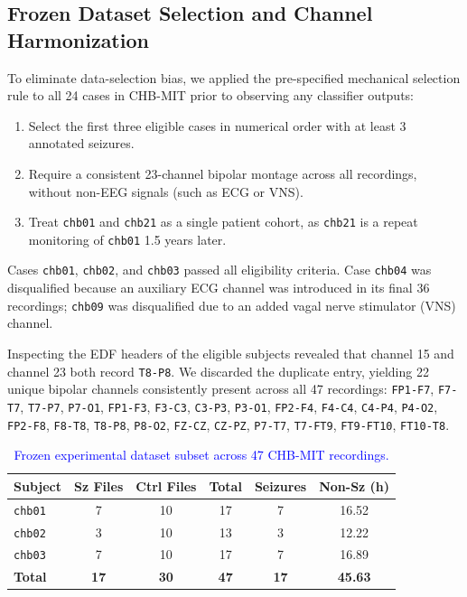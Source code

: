 \documentclass[10pt,twocolumn,letterpaper]{article}
\begin{document}
{\color{blue}
\subsection{Frozen Dataset Selection and Channel Harmonization}
\label{sec:dataset_selection}

To eliminate data-selection bias, we applied the pre-specified mechanical selection rule to all 24 cases in CHB-MIT prior to observing any classifier outputs:
\begin{enumerate}
    \item Select the first three eligible cases in numerical order with at least 3 annotated seizures.
    \item Require a consistent 23-channel bipolar montage across all recordings, without non-EEG signals (such as ECG or VNS).
    \item Treat \texttt{chb01} and \texttt{chb21} as a single patient cohort, as \texttt{chb21} is a repeat monitoring of \texttt{chb01} 1.5 years later.
\end{enumerate}

Cases \texttt{chb01}, \texttt{chb02}, and \texttt{chb03} passed all eligibility criteria. Case \texttt{chb04} was disqualified because an auxiliary ECG channel was introduced in its final 36 recordings; \texttt{chb09} was disqualified due to an added vagal nerve stimulator (VNS) channel.

Inspecting the EDF headers of the eligible subjects revealed that channel 15 and channel 23 both record \texttt{T8-P8}. We discarded the duplicate entry, yielding 22 unique bipolar channels consistently present across all 47 recordings:
\texttt{FP1-F7}, \texttt{F7-T7}, \texttt{T7-P7}, \texttt{P7-O1}, \texttt{FP1-F3}, \texttt{F3-C3}, \texttt{C3-P3}, \texttt{P3-O1}, \texttt{FP2-F4}, \texttt{F4-C4}, \texttt{C4-P4}, \texttt{P4-O2}, \texttt{FP2-F8}, \texttt{F8-T8}, \texttt{T8-P8}, \texttt{P8-O2}, \texttt{FZ-CZ}, \texttt{CZ-PZ}, \texttt{P7-T7}, \texttt{T7-FT9}, \texttt{FT9-FT10}, \texttt{FT10-T8}.

\begin{table}[h]
\centering
\footnotesize
\setlength{\tabcolsep}{3pt}
\color{blue}
\caption{\textcolor{blue}{Frozen experimental dataset subset across 47 CHB-MIT recordings.}}
\label{tab:dataset_frozen}
\begin{tabular}{lccccc}
\toprule
\textbf{Subject} & \textbf{Sz Files} & \textbf{Ctrl Files} & \textbf{Total} & \textbf{Seizures} & \textbf{Non-Sz (h)} \\
\midrule
\texttt{chb01} & 7 & 10 & 17 & 7 & 16.52 \\
\texttt{chb02} & 3 & 10 & 13 & 3 & 12.22 \\
\texttt{chb03} & 7 & 10 & 17 & 7 & 16.89 \\
\midrule
\textbf{Total} & \textbf{17} & \textbf{30} & \textbf{47} & \textbf{17} & \textbf{45.63} \\
\bottomrule
\end{tabular}
\end{table}

}
\end{document}
